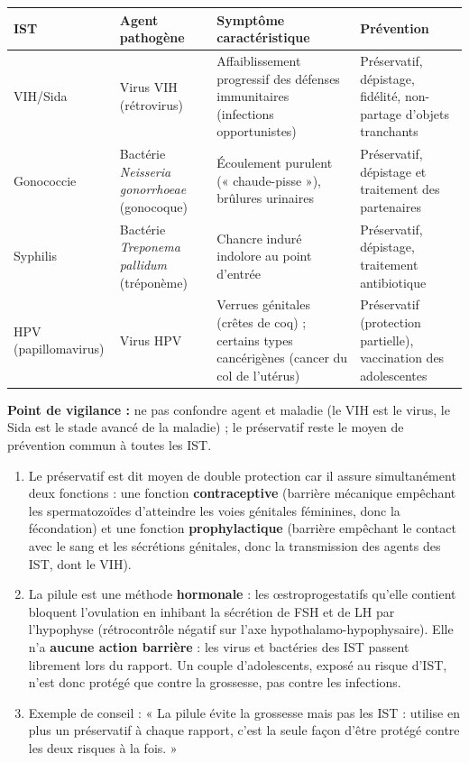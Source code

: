 \documentclass[11pt]{article}
\newcommand{\cle}[1]{{\popxbold\color{popdark}#1}}
\begin{document}
\begin{corrige}
\begin{center}
\begin{tabularx}{\linewidth}{|l|X|X|X|}
\hline
\rowcolor{popblueL} \textbf{IST} & \textbf{Agent pathogène} & \textbf{Symptôme caractéristique} & \textbf{Prévention} \\
\hline
VIH/Sida & Virus VIH (rétrovirus) & Affaiblissement progressif des défenses immunitaires (infections opportunistes) & Préservatif, dépistage, fidélité, non-partage d'objets tranchants \\
\hline
Gonococcie & Bactérie \emph{Neisseria gonorrhoeae} (gonocoque) & Écoulement purulent (« chaude-pisse »), brûlures urinaires & Préservatif, dépistage et traitement des partenaires \\
\hline
Syphilis & Bactérie \emph{Treponema pallidum} (tréponème) & Chancre induré indolore au point d'entrée & Préservatif, dépistage, traitement antibiotique \\
\hline
HPV (papillomavirus) & Virus HPV & Verrues génitales (crêtes de coq) ; certains types cancérigènes (cancer du col de l'utérus) & Préservatif (protection partielle), vaccination des adolescentes \\
\hline
\end{tabularx}
\end{center}
\textbf{Point de vigilance :} ne pas confondre agent et maladie (le VIH est le virus, le Sida est le stade avancé de la maladie) ; le préservatif reste le moyen de prévention commun à toutes les IST.
\end{corrige}

\begin{corrige}
\begin{enumerate}
\item Le préservatif est dit moyen de \cle{double protection} car il assure simultanément deux fonctions : une fonction \textbf{contraceptive} (barrière mécanique empêchant les spermatozoïdes d'atteindre les voies génitales féminines, donc la fécondation) et une fonction \textbf{prophylactique} (barrière empêchant le contact avec le sang et les sécrétions génitales, donc la transmission des agents des IST, dont le VIH).
\item La pilule est une méthode \textbf{hormonale} : les \oe{}stroprogestatifs qu'elle contient bloquent l'ovulation en inhibant la sécrétion de FSH et de LH par l'hypophyse (rétrocontrôle négatif sur l'axe hypothalamo-hypophysaire). Elle n'a \textbf{aucune action barrière} : les virus et bactéries des IST passent librement lors du rapport. Un couple d'adolescents, exposé au risque d'IST, n'est donc protégé que contre la grossesse, pas contre les infections.
\item Exemple de conseil : « La pilule évite la grossesse mais pas les IST : utilise en plus un préservatif à chaque rapport, c'est la seule façon d'être protégé contre les deux risques à la fois. »
\end{enumerate}
\end{corrige}
\end{document}
